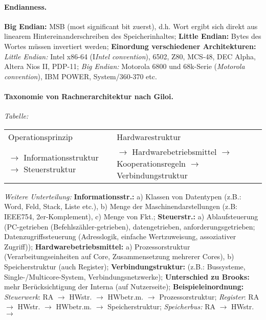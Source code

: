 \documentclass[8pt,a4paper]{article}
\begin{document}
\begin{multicols}{2}
\paragraph{Endianness.} \textbf{Big Endian:} MSB  (most significant bit zuerst), d.h. Wort ergibt sich direkt aus linearem Hintereinanderschreiben des Speicherinhaltes; \textbf{Little Endian:} Bytes des Wortes müssen invertiert werden; \textbf{Einordung verschiedener Architekturen:} 
\emph{Little Endian:} Intel x86-64 (I\emph{Intel convention}), 6502, Z80, MCS-48, DEC Alpha, Altera Nios II, PDP-11; \emph{Big Endian:} Motorola 6800 und 68k-Serie (\emph{Motorola convention}), IBM POWER, System/360-370 etc.


\paragraph{Taxonomie von Rachnerarchitektur nach Giloi.} \emph{Tabelle:}
\begin{tabular}{p{}p{}}
Operationsprinzip & Hardwarestruktur \\
$\rightarrow$ Informationsstruktur\newline
$\rightarrow$ Steuerstruktur & 
$\rightarrow$ Hardwarebetriebsmittel\newline 
$\rightarrow$ Kooperationsregeln\newline 
$\rightarrow$ Verbindungstruktur \\
\end{tabular}
\emph{Weitere Unterteilung:} \textbf{Informationsstr.:} a) Klassen von
Datentypen (z.B.: Word, Feld, Stack, Liste etc.), b) Menge der
Maschinendarstellungen (z.B: IEEE754, 2er-Komplement), c) Menge von
Fkt.; \textbf{Steuerstr.:} a) Ablaufsteuerung (PC-getrieben
(Befehlszähler-getrieben),  datengetrieben, anforderungsgetrieben;
Datenzugriffssteuerung (Adresslogik, einfache Wertzuweisung,
assoziativer Zugriff)); \textbf{Hardwarebetriebsmittel:} a)
Prozessorstruktur (Verarbeitungseinheiten auf Core, Zusammensetzung
mehrerer Cores), b) Speicherstruktur (auch Register);
\textbf{Verbindungstruktur:} (z.B.: Bussysteme,
Single-/Multicore-System, Verbindungsnetzwerke); \textbf{Unterschied
  zu Brooks:} mehr Berücksichtigung der Interna (auf Nutzerseite);
\textbf{Beispieleinordnung:}
\emph{Steuerwerk}: RA $\rightarrow$ HWstr. $\rightarrow$
HWbetr.m. $\rightarrow$ Prozessorstruktur;
\emph{Register}: RA $\rightarrow$ HWstr. $\rightarrow$
HWbetr.m. $\rightarrow$ Speicherstruktur;
\emph{Speicherbus:} RA $\rightarrow$ HWstr. $\rightarrow$

\end{multicols}
\end{document}
